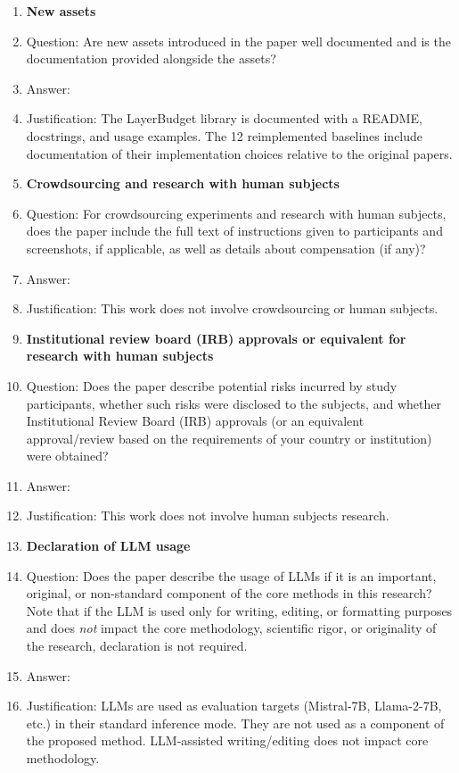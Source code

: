 \begin{enumerate}
\item {\bf New assets}
    \item[] Question: Are new assets introduced in the paper well documented and is the documentation provided alongside the assets?
    \item[] Answer: \answerYes{}
    \item[] Justification: The LayerBudget library is documented with a README, docstrings, and usage examples. The 12 reimplemented baselines include documentation of their implementation choices relative to the original papers.

\item {\bf Crowdsourcing and research with human subjects}
    \item[] Question: For crowdsourcing experiments and research with human subjects, does the paper include the full text of instructions given to participants and screenshots, if applicable, as well as details about compensation (if any)?
    \item[] Answer: \answerNA{}
    \item[] Justification: This work does not involve crowdsourcing or human subjects.

\item {\bf Institutional review board (IRB) approvals or equivalent for research with human subjects}
    \item[] Question: Does the paper describe potential risks incurred by study participants, whether such risks were disclosed to the subjects, and whether Institutional Review Board (IRB) approvals (or an equivalent approval/review based on the requirements of your country or institution) were obtained?
    \item[] Answer: \answerNA{}
    \item[] Justification: This work does not involve human subjects research.

\item {\bf Declaration of LLM usage}
    \item[] Question: Does the paper describe the usage of LLMs if it is an important, original, or non-standard component of the core methods in this research? Note that if the LLM is used only for writing, editing, or formatting purposes and does \emph{not} impact the core methodology, scientific rigor, or originality of the research, declaration is not required.
    \item[] Answer: \answerNA{}
    \item[] Justification: LLMs are used as evaluation targets (Mistral-7B, Llama-2-7B, etc.) in their standard inference mode. They are not used as a component of the proposed method. LLM-assisted writing/editing does not impact core methodology.

\end{enumerate}
